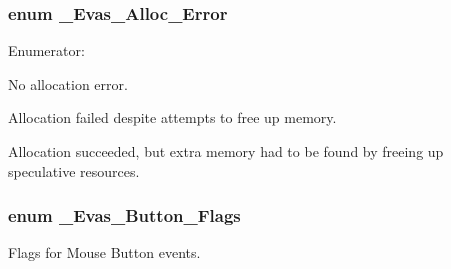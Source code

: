 \subsubsection[{\_\-Evas\_\-Alloc\_\-Error}]{\setlength{\rightskip}{0pt plus 5cm}enum {\bf \_\-Evas\_\-Alloc\_\-Error}}\label{Evas_8h_a1adf9f604f763f2a8db12a484ca199cb}
\begin{Desc}
\item[Enumerator: ]\par
\begin{description}
\item[{\em 
EVAS\_\-ALLOC\_\-ERROR\_\-NONE\label{Evas_8h_a1adf9f604f763f2a8db12a484ca199cba22bbdd0a96a670bbddd6789f91921af8}
}]No allocation error. \item[{\em 
EVAS\_\-ALLOC\_\-ERROR\_\-FATAL\label{Evas_8h_a1adf9f604f763f2a8db12a484ca199cbaba4052a7c95452ff5c6f2b615a655d8e}
}]Allocation failed despite attempts to free up memory. \item[{\em 
EVAS\_\-ALLOC\_\-ERROR\_\-RECOVERED\label{Evas_8h_a1adf9f604f763f2a8db12a484ca199cba5c6259613c3d063813f3b094f9d5bf8e}
}]Allocation succeeded, but extra memory had to be found by freeing up speculative resources. \end{description}
\end{Desc}

\subsubsection[{\_\-Evas\_\-Button\_\-Flags}]{\setlength{\rightskip}{0pt plus 5cm}enum {\bf \_\-Evas\_\-Button\_\-Flags}}\label{Evas_8h_a9b61a9a46b5824fc358a5a8c82cda8b9}


Flags for Mouse Button events. 

